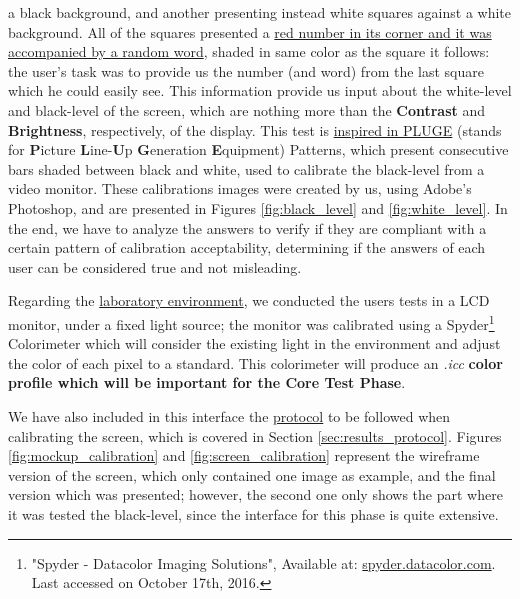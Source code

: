 a black background, and another presenting instead white squares against a white background. All of the squares presented a \ul{red number in its
corner and it was accompanied by a random word}, shaded in same color as the square it follows: the user's task was to provide us the number (and
word) from the last square which he could easily see. This information provide us input about the white-level and black-level of the screen, which
are nothing more than the \textbf{Contrast} and \textbf{Brightness}, respectively, of the display. This test is \ul{inspired in PLUGE} (stands for \textbf{P}icture
\textbf{L}ine-\textbf{U}p \textbf{G}eneration \textbf{E}quipment) Patterns, which present consecutive bars shaded between black and white, used to calibrate the black-level from a video
monitor. These calibrations images were created by us, using Adobe's Photoshop, and are presented in Figures \ref{fig:black_level} and
\ref{fig:white_level}. In the end, we have to analyze the answers to verify if they are compliant with a certain pattern of calibration acceptability,
determining if the answers of each user can be considered true and not misleading. \par
%
Regarding the \ul{laboratory environment}, we conducted the users tests in a LCD monitor, under a fixed light source; the monitor was calibrated
using a Spyder\footnote{"Spyder - Datacolor Imaging Solutions", Available at: \url{spyder.datacolor.com}. Last accessed on October 17th, 2016.}
Colorimeter which will consider the existing light in the environment and adjust the color of each pixel to a standard. This colorimeter will produce an
\emph{.icc} \textbf{color profile which will be important for the Core Test Phase}. \par
%
We have also included in this interface the \ul{protocol} to be followed when calibrating the screen, which is covered in Section \ref{sec:results_protocol}.
Figures \ref{fig:mockup_calibration} and \ref{fig:screen_calibration} represent the wireframe version of the screen, which only contained one image as
example, and the final version which was presented; however, the second one only shows the part where it was tested the black-level, since the interface
for this phase is quite extensive. \par
%
